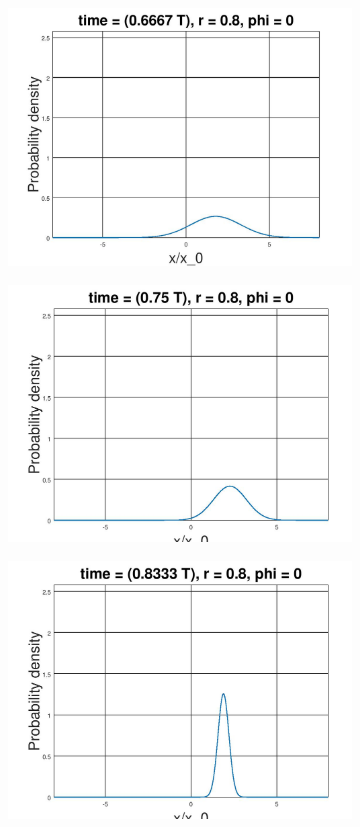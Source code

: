 \documentclass[12pt, twoside]{article}
\begin{document}
\begin{figure}[h!]
\begin{subfigure}[h!]{0.3\linewidth}
		\includegraphics[width=\linewidth]{graphs/squeeze_0.8/8.jpg}
	\end{subfigure}
	\begin{subfigure}[h!]{0.3\linewidth}
		\includegraphics[width=\linewidth]{graphs/squeeze_0.8/9.jpg}
	\end{subfigure}
	\begin{subfigure}[h!]{0.3\linewidth}
		\includegraphics[width=\linewidth]{graphs/squeeze_0.8/10.jpg}

\end{subfigure}
\end{figure}
\end{document}
